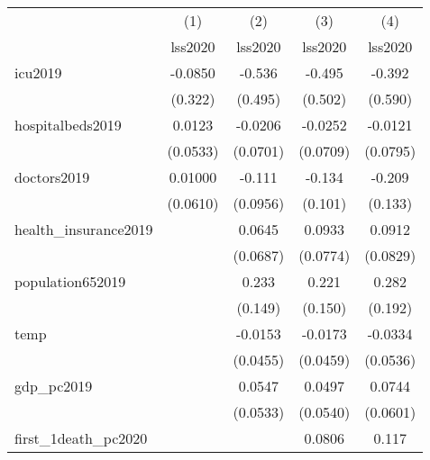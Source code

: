 {
\def\sym#1{\ifmmode^{#1}\else\(^{#1}\)\fi}
\begin{tabular}{l*{4}{c}}
\hline\hline
            &\multicolumn{1}{c}{(1)}&\multicolumn{1}{c}{(2)}&\multicolumn{1}{c}{(3)}&\multicolumn{1}{c}{(4)}\\
            &\multicolumn{1}{c}{lss2020}&\multicolumn{1}{c}{lss2020}&\multicolumn{1}{c}{lss2020}&\multicolumn{1}{c}{lss2020}\\
\hline
icu2019     &     -0.0850         &      -0.536         &      -0.495         &      -0.392         \\
            &     (0.322)         &     (0.495)         &     (0.502)         &     (0.590)         \\
[1em]
hospitalbeds2019&      0.0123         &     -0.0206         &     -0.0252         &     -0.0121         \\
            &    (0.0533)         &    (0.0701)         &    (0.0709)         &    (0.0795)         \\
[1em]
doctors2019 &     0.01000         &      -0.111         &      -0.134         &      -0.209         \\
            &    (0.0610)         &    (0.0956)         &     (0.101)         &     (0.133)         \\
[1em]
health\_insurance2019&                     &      0.0645         &      0.0933         &      0.0912         \\
            &                     &    (0.0687)         &    (0.0774)         &    (0.0829)         \\
[1em]
population652019&                     &       0.233         &       0.221         &       0.282         \\
            &                     &     (0.149)         &     (0.150)         &     (0.192)         \\
[1em]
temp        &                     &     -0.0153         &     -0.0173         &     -0.0334         \\
            &                     &    (0.0455)         &    (0.0459)         &    (0.0536)         \\
[1em]
gdp\_pc2019  &                     &      0.0547         &      0.0497         &      0.0744         \\
            &                     &    (0.0533)         &    (0.0540)         &    (0.0601)         \\
[1em]
first\_1death\_pc2020&                     &                     &      0.0806         &       0.117         \\

\end{tabular}}
